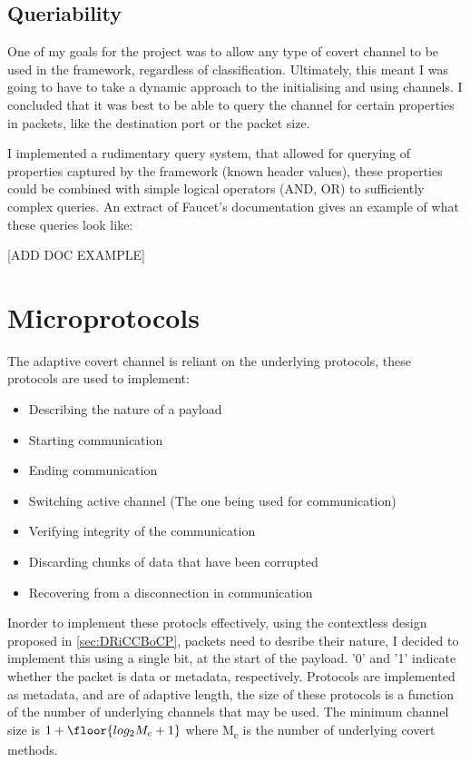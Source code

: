 \subsection{Queriability}

One of my goals for the project was to allow any type of covert channel to be used in the framework, regardless of classification. Ultimately, this meant I was going to have to take a dynamic approach to the initialising and using channels. I concluded that it was best to be able to query the channel for certain properties in packets, like the destination port or the packet size.

I implemented a rudimentary query system, that allowed for querying of properties captured by the framework (known header values), these properties could be combined with simple logical operators (AND, OR) to sufficiently complex queries. An extract of Faucet's documentation gives an example of what these queries look like:

[ADD DOC EXAMPLE]

\section{Microprotocols}

The adaptive covert channel is reliant on the underlying protocols, these protocols are used to implement:
\begin{itemize}
    \item Describing the nature of a payload
    \item Starting communication
    \item Ending communication
    \item Switching active channel (The one being used for communication)
    \item Verifying integrity of the communication
    \item Discarding chunks of data that have been corrupted
    \item Recovering from a disconnection in communication
\end{itemize}

Inorder to implement these protocls effectively, using the contextless design proposed in \ref{sec:DRiCCBoCP}, packets need to desribe their nature, I decided to implement this using a single bit, at the start of the payload. '0' and '1' indicate whether the packet is data or metadata, respectively. Protocols are implemented as metadata, and are of adaptive length, the size of these protocols is a function of the number of underlying channels that may be used. The minimum channel size is $1 + \floor{log_2{M_c + 1}}$ where M\textsubscript{c} is the number of underlying covert methods.
